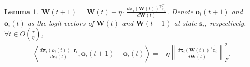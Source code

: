 \documentclass[10pt]{article}
\def\rvo{{\mathbf{o}}}
\def\rvs{{\mathbf{s}}}
\def\rvo{{\mathbf{o}}}
\def\rvtilder{{\tilde{\mathbf{r}}}}
\newtheorem{lem}{Lemma}
\def\rvpi{{\boldsymbol{\pi}}}
\def\rmW{{\mathbf{W}}}
\begin{document}
\begin{lem}
\label{lem:inner_product_logit_difference_logit_derivative}
    $\rmW(t+1) = \rmW(t) - \eta \cdot \frac{d \rvpi_i\left(\rmW(t)\right)^\top \hat{\rvtilder}_i}{d \rmW(t)}$. Denote $\rvo_i(t+1)$ and $\rvo_i(t)$ as the logit vectors of $\rmW(t)$ and $\rmW(t+1)$ at state $\rvs_i$, respectively. $\forall t \in O\left( \frac{\tau}{\eta}\right)$,
\begin{equation*}
\begin{split}
    \left\langle \frac{d \rvpi_i\left( \rvo_i(t) \right)^\top \hat{\rvtilder}_i}{d \rvo_i(t)}, \rvo_i(t+1) - \rvo_i(t) \right\rangle = - \eta \left\| \frac{d \rvpi_i\left(\rmW(t)\right)^\top \hat{\rvtilder}_i}{d \rmW(t)} \right\|_F^2.
\end{split}
\end{equation*}
\end{lem}
\end{document}
